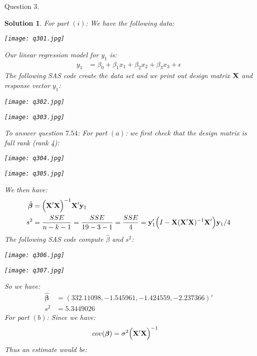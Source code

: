 \documentclass[11pt]{article}
\newtheorem{sol}{Solution}
\begin{document}
Question $3$.
\begin{sol}
	For part $(i)$:\vskip 2mm
	We have the following data:
	\begin{center}
		\texttt{[image: q301.jpg]}
	\end{center}
	Our linear regression model for $y_1$ is:
	\begin{align*}
		y_1 &= \beta_0 + \beta_1 x_1 + \beta_2 x_2 + \beta_3 x_3 + \epsilon
	\end{align*}
	The following SAS code create the data set and we print out design matrix ${\bf X}$ and response vector $y_1$:
	\begin{center}
		\texttt{[image: q302.jpg]}
	\end{center}
	\begin{center}
		\texttt{[image: q303.jpg]}
	\end{center}
	To answer question $7.54$:\vskip 2mm
	For part $(a)$:\vskip 2mm
	we first check that the design matrix is full rank (rank 4):
	\begin{center}
		\texttt{[image: q304.jpg]}
	\end{center}
	\begin{center}
		\texttt{[image: q305.jpg]}
	\end{center}
	We then have:
	\begin{align*}
		\hat{{\bm \beta}} &= \Big({\bf X}'{\bf X}\Big)^{-1}{\bf X}'{\bf y}_1\\
		s^2 &= \frac{SSE}{n - k - 1} = \frac{SSE}{19 - 3 -1} = \frac{SSE}{4} = {\bf y}_1'\Big(I - {\bf X}({\bf X}'{\bf X})^{-1}{\bf X}'\Big){\bf y}_1/4
	\end{align*}
	The following SAS code compute $\hat{\beta}$ and $s^2$:
	\begin{center}
		\texttt{[image: q306.jpg]}
	\end{center}
	\begin{center}
		\texttt{[image: q307.jpg]}
	\end{center}
	So we have:
	\begin{align*}
		\hat{{\bm \beta}} &= (332.11098, -1.545961, -1.424559, -2.237366)'\\
		s^2 &= 5.3449026
	\end{align*}
	For part $(b)$:\vskip 2mm
	Since we have:
	\begin{align*}
		cov({\bm \beta}) &= \sigma^2\Big({\bf X}'{\bf X}\Big)^{-1}
	\end{align*}
	Thus an estimate would be:
	\begin{align*}

\end{align*}
\end{sol}
\end{document}
